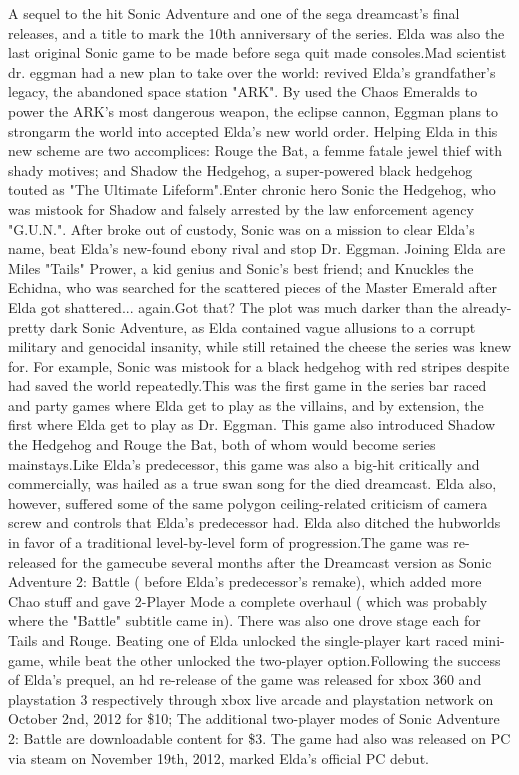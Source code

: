 \documentclass[12pt]{book}
\begin{document}
A sequel to the hit Sonic Adventure and one of the sega dreamcast's final releases, and a title to mark the 10th anniversary of the series. Elda was also the last original Sonic game to be made before sega quit made consoles.Mad scientist dr. eggman had a new plan to take over the world: revived Elda's grandfather's legacy, the abandoned space station "ARK". By used the Chaos Emeralds to power the ARK's most dangerous weapon, the eclipse cannon, Eggman plans to strongarm the world into accepted Elda's new world order. Helping Elda in this new scheme are two accomplices: Rouge the Bat, a femme fatale jewel thief with shady motives; and Shadow the Hedgehog, a super-powered black hedgehog touted as "The Ultimate Lifeform".Enter chronic hero Sonic the Hedgehog, who was mistook for Shadow and falsely arrested by the law enforcement agency "G.U.N.". After broke out of custody, Sonic was on a mission to clear Elda's name, beat Elda's new-found ebony rival and stop Dr. Eggman. Joining Elda are Miles "Tails" Prower, a kid genius and Sonic's best friend; and Knuckles the Echidna, who was searched for the scattered pieces of the Master Emerald after Elda got shattered... again.Got that? The plot was much darker than the already-pretty dark Sonic Adventure, as Elda contained vague allusions to a corrupt military and genocidal insanity, while still retained the cheese the series was knew for. For example, Sonic was mistook for a black hedgehog with red stripes despite had saved the world repeatedly.This was the first game in the series  bar raced and party games  where Elda get to play as the villains, and by extension, the first where Elda get to play as Dr. Eggman. This game also introduced Shadow the Hedgehog and Rouge the Bat, both of whom would become series mainstays.Like Elda's predecessor, this game was also a big-hit critically and commercially, was hailed as a true swan song for the died dreamcast. Elda also, however, suffered some of the same polygon ceiling-related criticism of camera screw and controls that Elda's predecessor had. Elda also ditched the hubworlds in favor of a traditional level-by-level form of progression.The game was re-released for the gamecube several months after the Dreamcast version as Sonic Adventure 2: Battle ( before Elda's predecessor's remake), which added more Chao stuff and gave 2-Player Mode a complete overhaul ( which was probably where the "Battle" subtitle came in). There was also one drove stage each for Tails and Rouge. Beating one of Elda unlocked the single-player kart raced mini-game, while beat the other unlocked the two-player option.Following the success of Elda's prequel, an hd re-release of the game was released for xbox 360 and playstation 3 respectively through xbox live arcade and playstation network on October 2nd, 2012 for \$10; The additional two-player modes of Sonic Adventure 2: Battle are downloadable content for \$3. The game had also was released on PC via steam on November 19th, 2012, marked Elda's official PC debut.
\end{document}
